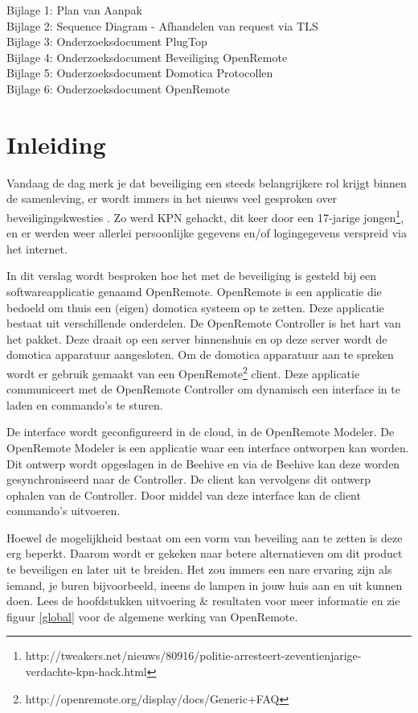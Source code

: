 \documentclass[]{article}
\begin{document}
\newpage
\thispagestyle{empty}
\tableofcontents
Bijlage 1: Plan van Aanpak\\
Bijlage 2: Sequence Diagram - Afhandelen van request via TLS\\
Bijlage 3: Onderzoeksdocument PlugTop\\
Bijlage 4: Onderzoeksdocument Beveiliging OpenRemote\\
Bijlage 5: Onderzoeksdocument Domotica Protocollen\\
Bijlage 6: Onderzoeksdocument OpenRemote\\
\thispagestyle{empty}
\newpage
\thispagestyle{empty}
\listoftables
\listoffigures

\newpage
\section{Inleiding}
Vandaag de dag merk je dat beveiliging een steeds belangrijkere rol krijgt binnen
de samenleving, er wordt immers in het nieuws veel gesproken over beveiligingskwesties
. Zo werd KPN gehackt, dit keer door een 17-jarige
jongen\footnote{http://tweakers.net/nieuws/80916/politie-arresteert-zeventienjarige-verdachte-kpn-hack.html}, en
er werden weer allerlei persoonlijke gegevens en/of logingegevens verspreid via het
internet.

In dit verslag wordt besproken hoe het met de beveiliging is gesteld bij een
softwareapplicatie genaamd OpenRemote. OpenRemote is een applicatie die
bedoeld om thuis een (eigen) domotica systeem op te zetten. Deze applicatie
bestaat uit verschillende onderdelen. De OpenRemote Controller is het hart van
het pakket. Deze draait op een server binnenshuis en op deze server wordt de
domotica apparatuur aangesloten. Om de domotica apparatuur aan te spreken wordt
er gebruik gemaakt van een
OpenRemote\footnote{http://openremote.org/display/docs/Generic+FAQ} client. Deze applicatie communiceert met de
OpenRemote Controller om dynamisch een interface in te laden en commando's te
sturen. 

De interface wordt geconfigureerd in de cloud, in de OpenRemote Modeler. De
OpenRemote Modeler is een applicatie waar een interface ontworpen kan worden.
Dit ontwerp wordt opgeslagen in de Beehive en via de Beehive kan deze worden
gesynchroniseerd naar de Controller. De client kan vervolgens dit ontwerp
ophalen van de Controller. Door middel van deze interface kan de client
commando's uitvoeren. 

Hoewel de mogelijkheid bestaat om een vorm van beveiling aan te zetten is deze
erg beperkt. Daarom wordt er gekeken naar betere alternatieven om dit product te
beveiligen en later uit te breiden. Het zou immers een nare ervaring zijn als
iemand, je buren bijvoorbeeld, ineens de lampen in jouw huis aan en uit kunnen
doen. Lees de hoofdstukken uitvoering \& resultaten voor meer informatie en zie
figuur \ref{global} voor de algemene werking van OpenRemote.
\end{document}
